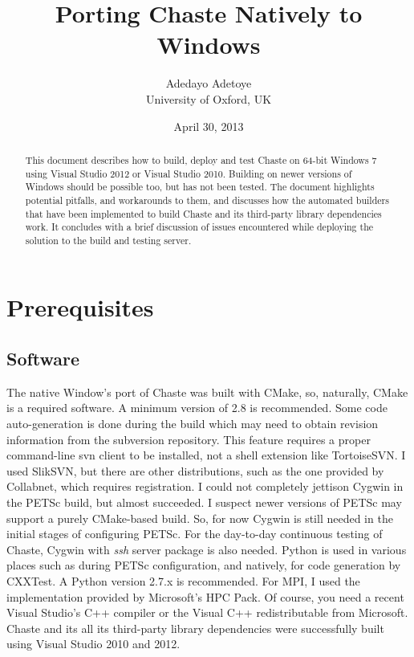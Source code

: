 \documentclass[10pt,a4paper]{article}
\title{Porting Chaste Natively to Windows}
\author{Adedayo Adetoye\\University of Oxford, UK}
\date{April 30, 2013}
\begin{document}
\maketitle
\begin{abstract}
This document describes how to build, deploy and test Chaste on 64-bit Windows 7
using Visual Studio 2012 or Visual Studio 2010. Building on newer versions of
Windows should be possible too, but has not been tested. The document highlights
potential pitfalls, and workarounds to them, and discusses how the automated
builders that have been implemented to build Chaste and its third-party library
dependencies work. It concludes with a brief discussion of issues encountered
while deploying the solution to the build and testing server.
\end{abstract}

\section{Prerequisites}
\subsection{Software}
The native Window's port of Chaste was built with CMake, so, naturally, CMake is
a required software. A minimum version of 2.8 is recommended. Some code
auto-generation is done during the build which may need to obtain revision
information from the subversion repository. This feature requires a proper
command-line svn client to be installed, not a shell extension like TortoiseSVN.
I used SlikSVN, but there are other distributions, such as the one provided by
Collabnet, which requires registration. I could not completely jettison Cygwin
in the PETSc build, but almost succeeded. I suspect newer versions of PETSc may
support a purely CMake-based build. So, for now Cygwin is still needed in the
initial stages of configuring PETSc. For the day-to-day continuous testing of
Chaste, Cygwin with \textit{ssh} server package is also needed. Python is used
in various places such as during PETSc configuration, and natively, for code
generation by CXXTest. A Python version 2.7.x is recommended. For MPI, I used
the implementation provided by Microsoft's HPC Pack. Of course, you need a
recent Visual Studio's C++
compiler or the Visual C++ redistributable from Microsoft. Chaste and its all
its third-party library dependencies were successfully built using Visual Studio
2010 and 2012. 
\end{document}
